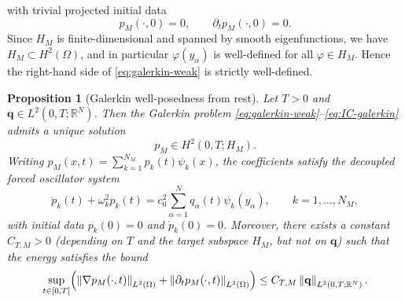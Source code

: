 \documentclass[11pt,a4paper]{article}
\numberwithin{equation}{section}
\newtheorem{proposition}[theorem]{Proposition}
\newcommand{\norm}[1]{\left\lVert #1 \right\rVert}
\begin{document}
with trivial projected initial data
\begin{equation}
\label{eq:IC-galerkin}
 p_M(\cdot,0)=0,\qquad \partial_t p_M(\cdot,0)=0.
\end{equation}
Since $H_M$ is finite-dimensional and spanned by smooth eigenfunctions, we have $H_M \subset H^2(\Omega)$, and in particular $\varphi(y_\alpha)$ is well-defined for all $\varphi\in H_M$. Hence the right-hand side of \eqref{eq:galerkin-weak} is strictly well-defined.

\begin{proposition}[Galerkin well-posedness from rest]
\label{prop:well-posed}
Let $T>0$ and $\mathbf q\in L^2(0,T;\mathbb R^N)$. Then the Galerkin problem
\eqref{eq:galerkin-weak}--\eqref{eq:IC-galerkin} admits a unique solution
\[
 p_M\in H^2(0,T;H_M).
\]
Writing $p_M(x,t)=\sum_{k=1}^{N_M} p_k(t)\psi_k(x)$, the coefficients satisfy the decoupled forced oscillator system
\begin{equation}
\label{eq:mode-ODE-N}
 \ddot p_k(t)+\omega_k^2 p_k(t)
 = c_0^2 \sum_{\alpha=1}^N q_\alpha(t)\psi_k(y_\alpha),
 \qquad k=1,\dots,N_M,
\end{equation}
with initial data $p_k(0)=0$ and $\dot p_k(0)=0$.
Moreover, there exists a constant $C_{T,M}>0$ (depending on $T$ and the target subspace $H_M$, but not on $\mathbf{q}$) such that the energy satisfies the bound
\begin{equation}
\label{eq:galerkin-energy-est}
 \sup_{t\in[0,T]}
 \Bigl(
  \norm{\nabla p_M(\cdot,t)}_{L^2(\Omega)}
  + \norm{\partial_t p_M(\cdot,t)}_{L^2(\Omega)}
 \Bigr)
 \le C_{T,M} \norm{\mathbf q}_{L^2(0,T;\mathbb R^N)}.
\end{equation}
\end{proposition}
\end{document}
